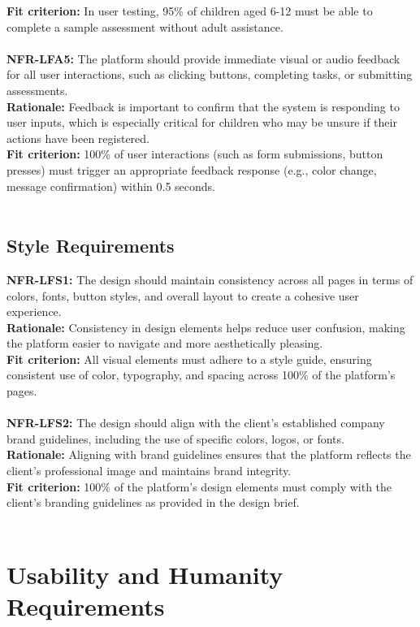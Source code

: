 \documentclass[12pt]{article}
\begin{document}
\textbf{Fit criterion: }In user testing, 95\% of children aged 6-12 must be able to complete a sample assessment without adult assistance.\\\\
\textbf{NFR-LFA5: }The platform should provide immediate visual or audio feedback for all user interactions, such as clicking buttons, completing tasks, or submitting assessments.\\
\textbf{Rationale: }Feedback is important to confirm that the system is responding to user inputs, which is especially critical for children who may be unsure if their actions have been registered.\\
\textbf{Fit criterion: }100\% of user interactions (such as form submissions, button presses) must trigger an appropriate feedback response (e.g., color change, message confirmation) within 0.5 seconds.\\\\
\subsection{Style Requirements}
\textbf{NFR-LFS1: }The design should maintain consistency across all pages in terms of colors, fonts, button styles, and overall layout to create a cohesive user experience.\\
\textbf{Rationale: }Consistency in design elements helps reduce user confusion, making the platform easier to navigate and more aesthetically pleasing.\\
\textbf{Fit criterion: }All visual elements must adhere to a style guide, ensuring consistent use of color, typography, and spacing across 100\% of the platform’s pages.\\\\
\textbf{NFR-LFS2: }The design should align with the client's established company brand guidelines, including the use of specific colors, logos, or fonts.\\
\textbf{Rationale: }Aligning with brand guidelines ensures that the platform reflects the client's professional image and maintains brand integrity.\\
\textbf{Fit criterion: }100\% of the platform’s design elements must comply with the client’s branding guidelines as provided in the design brief.\\\\

\section{Usability and Humanity Requirements}
\end{document}
